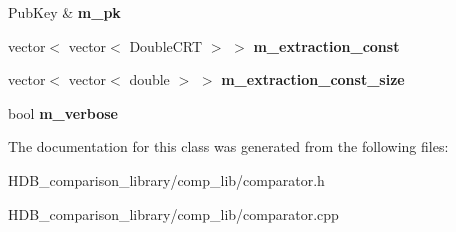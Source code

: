 \begin{DoxyCompactItemize}
Pub\+Key \& {\bfseries m\+\_\+pk}
\item 
\mbox{\label{classhe__cmp_1_1Comparator_a154a128a73070ba8615f2fdd2c44d7d2}} 
vector$<$ vector$<$ Double\+C\+RT $>$ $>$ {\bfseries m\+\_\+extraction\+\_\+const}
\item 
\mbox{\label{classhe__cmp_1_1Comparator_ad10e3af4762c74248d29a87de71ac423}} 
vector$<$ vector$<$ double $>$ $>$ {\bfseries m\+\_\+extraction\+\_\+const\+\_\+size}
\item 
\mbox{\label{classhe__cmp_1_1Comparator_a2847cde92d93815337a798758d522236}} 
bool {\bfseries m\+\_\+verbose}
\end{DoxyCompactItemize}


The documentation for this class was generated from the following files\+:\begin{DoxyCompactItemize}
\item 
H\+D\+B\+\_\+comparison\+\_\+library/comp\+\_\+lib/comparator.\+h\item 
H\+D\+B\+\_\+comparison\+\_\+library/comp\+\_\+lib/comparator.\+cpp\end{DoxyCompactItemize}
